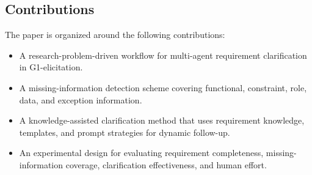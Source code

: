 \subsection{Contributions}
The paper is organized around the following contributions:
\begin{itemize}[leftmargin=*]
  \item A research-problem-driven workflow for multi-agent requirement clarification in G1-elicitation.
  \item A missing-information detection scheme covering functional, constraint, role, data, and exception information.
  \item A knowledge-assisted clarification method that uses requirement knowledge, templates, and prompt strategies for dynamic follow-up.
  \item An experimental design for evaluating requirement completeness, missing-information coverage, clarification effectiveness, and human effort.
\end{itemize}

